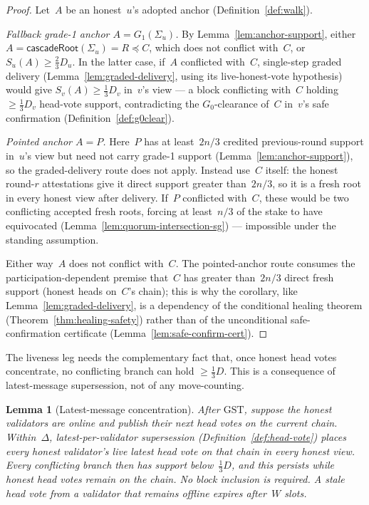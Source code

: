 \ifx\litemode\undefined\documentclass{article}\fi
\newcommand{\GST}{\ensuremath{\mathrm{GST}}\xspace}
\newcommand{\Supp}{\ensuremath{S}}          %
\newcommand{\Dvote}{\ensuremath{D}}         %
\newcommand{\Wvote}{\ensuremath{W}}         %
\newcommand{\Gzero}{\ensuremath{G_{0}}}
\newcommand{\Gone}{\ensuremath{G_{1}}}
\newcommand{\cascadeRoot}{\textsf{cascadeRoot}\xspace}
\theoremstyle{plain}
\newtheorem{lemma}{Lemma}
\theoremstyle{definition}
\theoremstyle{remark}
\begin{document}
\begin{proof}
Let~\(A\) be an honest~\(u\)'s adopted anchor (Definition~\ref{def:walk}).

\emph{Fallback grade-1 anchor \(A = \Gone(\Sigma_u)\).}  By
Lemma~\ref{lem:anchor-support}, either \(A = \cascadeRoot(\Sigma_u) = R \preceq C\),
which does not conflict with~\(C\), or \(\Supp_u(A) \geq \tfrac23\Dvote_u\).  In the
latter case, if~\(A\) conflicted with~\(C\), single-step graded delivery
(Lemma~\ref{lem:graded-delivery}, using its live-honest-vote hypothesis) would
give \(\Supp_v(A) \geq \tfrac13\Dvote_v\) in~\(v\)'s view --- a block conflicting
with~\(C\) holding \(\geq\tfrac13\Dvote_v\) head-vote support, contradicting the
\(\Gzero\)-clearance of~\(C\) in~\(v\)'s safe confirmation
(Definition~\ref{def:g0clear}).

\emph{Pointed anchor \(A=P\).}  Here~\(P\) has at least~\(2n/3\) credited
previous-round support in~\(u\)'s view but need not carry grade-1 support
(Lemma~\ref{lem:anchor-support}), so the graded-delivery route does not apply.
Instead use~\(C\) itself: the honest round-$r$ attestations give it direct
support greater than~\(2n/3\), so it is a fresh root in every honest view after
delivery.  If~\(P\) conflicted with~\(C\), these would be two conflicting
accepted fresh roots, forcing at least~\(n/3\) of the stake to have equivocated
(Lemma~\ref{lem:quorum-intersection-sg}) --- impossible under the standing
assumption.

Either way~\(A\) does not conflict with~\(C\).  The pointed-anchor route consumes
the participation-dependent premise that~\(C\) has greater than~\(2n/3\) direct
fresh support (honest heads
on~\(C\)'s chain); this is why the corollary, like
Lemma~\ref{lem:graded-delivery}, is a dependency of the conditional healing theorem
(Theorem~\ref{thm:healing-safety}) rather than of the unconditional
safe-confirmation certificate (Lemma~\ref{lem:safe-confirm-cert}).
\end{proof}

The liveness leg needs the complementary fact that, once honest head votes
concentrate, no conflicting branch can hold \(\geq\tfrac13\Dvote\).  This is a
consequence of latest-message supersession, not of any move-counting.

\begin{lemma}[Latest-message concentration]\label{lem:vote-concentration}
After \GST, suppose the honest validators are online and publish their next head
votes on the current chain.  Within~\(\Delta\), latest-per-validator
supersession (Definition~\ref{def:head-vote}) places every honest validator's
live latest head vote on that chain in every honest view.  Every conflicting
branch then has support below~\(\tfrac13\Dvote\), and this persists while honest
head votes remain on the chain.  No block inclusion is required.  A stale head
vote from a validator that remains offline expires after~\(\Wvote\) slots.
\end{lemma}
\end{document}

